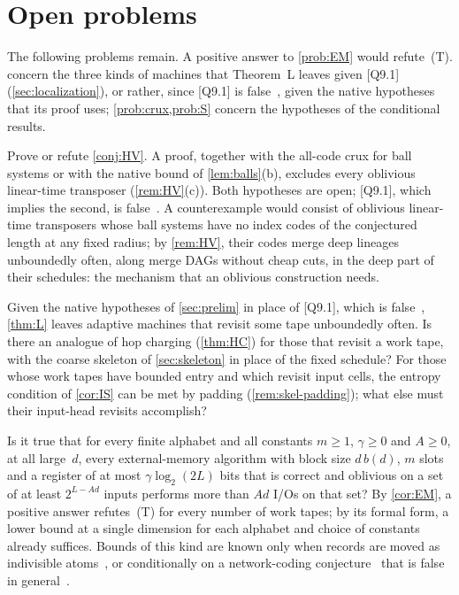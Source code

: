 \section{Open problems}\label{sec:open}

The following problems remain. A positive answer to \cref{prob:EM} would refute~(T). 
concern the three kinds of machines that Theorem~L leaves given [Q9.1] (\cref{sec:localization}), or rather, since
[Q9.1] is false~\cite{StorageCodes2026}, given the native hypotheses that its proof uses; \cref{prob:crux,prob:S}
concern the hypotheses of the conditional results.

\begin{problem}\label{prob:HV}
Prove or refute \cref{conj:HV}. A proof, together with the all-code crux for ball systems or with the native bound of
\cref{lem:balls}(b), excludes every oblivious linear-time transposer (\cref{rem:HV}(c)). Both hypotheses are open;
[Q9.1], which implies the second, is false~\cite{StorageCodes2026}. A counterexample would consist of oblivious
linear-time transposers whose ball systems have no index codes of the conjectured length at any fixed radius; by
\cref{rem:HV}, their codes merge deep lineages unboundedly often, along merge DAGs without cheap cuts, in the deep part of
their schedules: the mechanism that an oblivious construction needs.
\end{problem}

\begin{problem}\label{prob:adaptive-deep}
Given the native hypotheses of \cref{sec:prelim} in place of [Q9.1], which is false~\cite{StorageCodes2026},
\cref{thm:L} leaves adaptive machines that revisit some tape unboundedly often. Is there an analogue
of hop charging (\cref{thm:HC}) for those that revisit a work tape, with the coarse skeleton of \cref{sec:skeleton} in
place of the fixed schedule? For those whose work tapes have bounded entry and which revisit input cells, the entropy
condition of \cref{cor:IS} can be met by padding (\cref{rem:skel-padding}); what else must their input-head revisits
accomplish?
\end{problem}

\begin{problem}\label{prob:EM}
Is it true that for every finite alphabet and all constants $m\ge1$, $\gamma\ge0$ and $A\ge0$, at all large~$d$, every
external-memory algorithm with block size $d\,b(d)$, $m$ slots and a register of at most $\gamma\log_2(2L)$ bits that is
correct and oblivious on a set of at least $2^{L-Ad}$ inputs performs more than $Ad$ I/Os on that set? By \cref{cor:EM},
a positive answer refutes~(T) for every number of work tapes; by its formal form, a lower bound at a single dimension for
each alphabet and choice of constants already suffices. Bounds of this kind are known only when records are
moved as indivisible atoms~\cite{AggarwalVitter1988}, or conditionally on a network-coding conjecture~\cite{FHLS2019}
that is false in general~\cite{BravermanHe2026}.
\end{problem}

